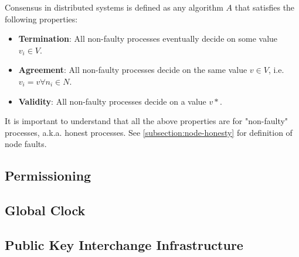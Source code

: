 Consensus in distributed systems is defined as any algorithm $A$ that satisfies the following properties:
\begin{itemize}
    \item \textbf{Termination}: All non-faulty processes eventually decide on some value $v_i \in V$.
    \item \textbf{Agreement}: All non-faulty processes decide on the same value $v \in V$, i.e. $v_i = v \forall n_i \in N$.
    \item \textbf{Validity}: All non-faulty processes decide on a value $v*$.
\end{itemize}

It is important to understand that all the above properties are for "non-faulty" processes, a.k.a. honest processes. See \ref{subsection:node-honesty} for definition of node faults.

\subsection{Permissioning}

\subsection{Global Clock}

\subsection{Public Key Interchange Infrastructure}